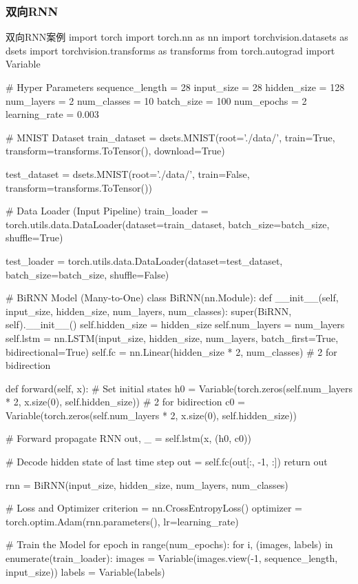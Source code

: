 \documentclass[openbib]{article}
\begin{document}
\subsubsection{双向RNN}
\begin{Python}{双向RNN案例}
import torch
import torch.nn as nn
import torchvision.datasets as dsets
import torchvision.transforms as transforms
from torch.autograd import Variable

# Hyper Parameters
sequence_length = 28
input_size = 28
hidden_size = 128
num_layers = 2
num_classes = 10
batch_size = 100
num_epochs = 2
learning_rate = 0.003

# MNIST Dataset
train_dataset = dsets.MNIST(root='./data/',
train=True,
transform=transforms.ToTensor(),
download=True)

test_dataset = dsets.MNIST(root='./data/',
train=False,
transform=transforms.ToTensor())

# Data Loader (Input Pipeline)
train_loader = torch.utils.data.DataLoader(dataset=train_dataset,
batch_size=batch_size,
shuffle=True)

test_loader = torch.utils.data.DataLoader(dataset=test_dataset,
batch_size=batch_size,
shuffle=False)


# BiRNN Model (Many-to-One)
class BiRNN(nn.Module):
	def __init__(self, input_size, hidden_size, num_layers, num_classes):
		super(BiRNN, self).__init__()
		self.hidden_size = hidden_size
		self.num_layers = num_layers
		self.lstm = nn.LSTM(input_size, hidden_size, num_layers,
		batch_first=True, bidirectional=True)
		self.fc = nn.Linear(hidden_size * 2, num_classes)  # 2 for bidirection

	def forward(self, x):
# Set initial states
		h0 = Variable(torch.zeros(self.num_layers * 2, x.size(0), self.hidden_size))  # 2 for bidirection
		c0 = Variable(torch.zeros(self.num_layers * 2, x.size(0), self.hidden_size))

# Forward propagate RNN
		out, _ = self.lstm(x, (h0, c0))

# Decode hidden state of last time step
		out = self.fc(out[:, -1, :])
		return out


rnn = BiRNN(input_size, hidden_size, num_layers, num_classes)

# Loss and Optimizer
criterion = nn.CrossEntropyLoss()
optimizer = torch.optim.Adam(rnn.parameters(), lr=learning_rate)

# Train the Model
for epoch in range(num_epochs):
	for i, (images, labels) in enumerate(train_loader):
		images = Variable(images.view(-1, sequence_length, input_size))
		labels = Variable(labels)


\end{Python}
\end{document}
